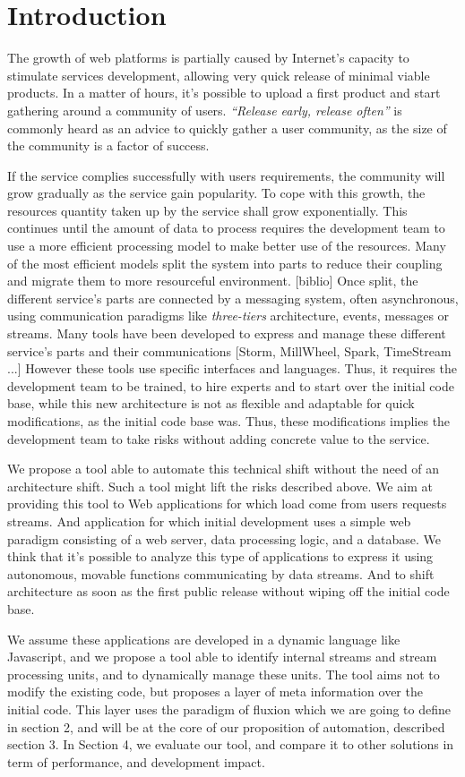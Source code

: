 \section{Introduction}


The growth of web platforms is partially caused by Internet's capacity to stimulate services development, allowing very quick release of minimal viable products.
In a matter of hours, it's possible to upload a first product and start gathering around a community of users.
\textit{``Release early, release often''} is commonly heard as an advice to quickly gather a user community, as the size of the community is a factor of success.

If the service complies successfully with users requirements, the community will grow gradually as the service gain popularity.
To cope with this growth, the resources quantity taken up by the service shall grow exponentially.
This continues until the amount of data to process requires the development team to use a more efficient processing model to make better use of the resources.
Many of the most efficient models split the system into parts to reduce their coupling and migrate them to more resourceful environment. [biblio]
Once split, the different service's parts are connected by a messaging system, often asynchronous, using communication paradigms like \textit{three-tiers} architecture, events, messages or streams.
Many tools have been developed to express and manage these different service's parts and their communications [Storm, MillWheel, Spark, TimeStream ...]
However these tools use specific interfaces and languages.
Thus, it requires the development team to be trained, to hire experts and to start over the initial code base, while this new architecture is not as flexible and adaptable for quick modifications, as the initial code base was.
Thus, these modifications implies the development team to take risks without adding concrete value to the service.

We propose a tool able to automate this technical shift without the need of an architecture shift.
Such a tool might lift the risks described above.
We aim at providing this tool to Web applications for which load come from users requests streams.
And application for which initial development uses a simple web paradigm consisting of a web server, data processing logic, and a database.
We think that it's possible to analyze this type of applications to express it using autonomous, movable functions communicating by data streams.
And to shift architecture as soon as the first public release without wiping off the initial code base.

We assume these applications are developed in a dynamic language like Javascript, and we propose a tool able to identify internal streams and stream processing units, and to dynamically manage these units.
The tool aims not to modify the existing code, but proposes a layer of meta information over the initial code.
This layer uses the paradigm of fluxion which we are going to define in section 2, and will be at the core of our proposition of automation, described section 3.
In Section 4, we evaluate our tool, and compare it to other solutions in term of performance, and development impact.